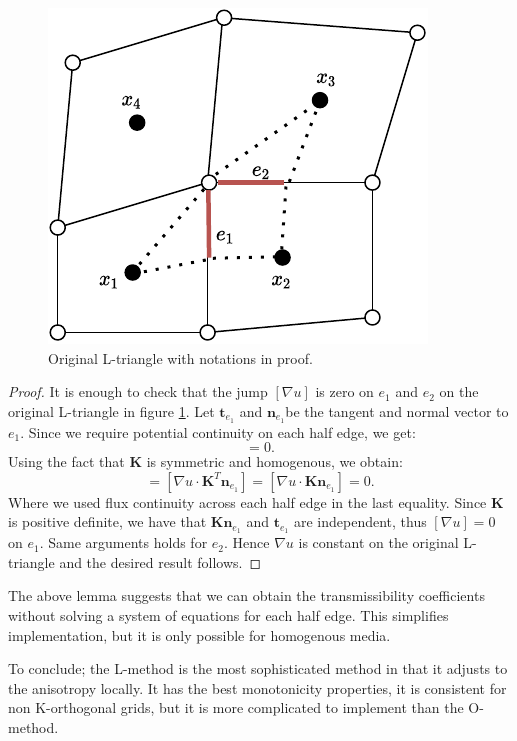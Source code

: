 \documentclass[../Main/main.tex]{subfiles}
\begin{document}
	\begin{figure}[H]
		\centering
		\includegraphics{right choice 2.pdf}	
		\caption{Original L-triangle with notations in proof.}
		\label{fig:original right choice}
	\end{figure}
	\begin{proof}
		It is enough to check that the jump $[\nabla u]$ is zero on $e_1$ and $e_2$ on the original L-triangle in figure \ref{fig:original right choice}. Let $\bm{t}_{e_1}$ and $\bm{n}_{e_1} $be the tangent and normal vector to $e_1$. Since we require potential continuity on each half edge, we get:
		\begin{equation}
			[\nabla u \cdot \bm{t}_{e_1}]=0.
		\end{equation}
		Using the fact that $\bm{K}$ is symmetric and homogenous, we obtain:
		\begin{equation}
			[\bm{K} \nabla u \cdot \bm{n}_{e_1}]=[\nabla u \cdot \bm{K}^T \bm{n}_{e_1}]=[\nabla u \cdot \bm{K}\bm{n}_{e_1}]=0.
		\end{equation}
		Where we used flux continuity across each half edge in the last equality. Since $\bm{K}$ is positive definite, we have that $\bm{K}\bm{n}_{e_1}$ and $\bm{t}_{e_1}$ are independent, thus $[\nabla u]=0$ on $e_1$. Same arguments holds for $e_2$. Hence $\nabla u$ is constant on the original L-triangle and the desired result follows.
	\end{proof}
	\begin{remark}
		The above lemma suggests that we can obtain the transmissibility coefficients without solving a system of equations for each half edge. This simplifies implementation, but it is only possible for homogenous media.
	\end{remark}
	\par 
	To conclude; the L-method is the most sophisticated method in that it adjusts to the anisotropy locally. It has the best monotonicity properties, it is consistent for non K-orthogonal grids, but it is more complicated to implement than the O-method. 
\end{document}
